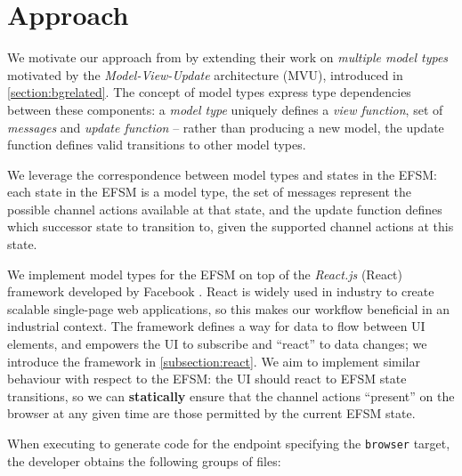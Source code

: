 \section{Approach}
\label{section:reactapproach}

We motivate our approach from \cite{MVU2020} by extending
their work on \textit{multiple model types} motivated by the
\textit{Model-View-Update} architecture (MVU),
introduced in \cref{section:bgrelated}.
The concept of model types express type dependencies between these
components: a \emph{model type} uniquely defines a \textit{view function},
set of \textit{messages} and \textit{update function} -- rather than
producing a new model, the update function defines valid transitions to
other model types.

We leverage the correspondence between model types 
and states in the EFSM:
each state in the EFSM is a model type, the set of messages represent
the possible channel actions available at that state,
and the update function defines which successor state to transition to,
given the supported channel actions at this state.

We implement model types for the EFSM on top of the 
\emph{React.js} (React) framework developed by Facebook \cite{React}.
React is widely used in industry to create scalable single-page
web applications, so this makes our workflow beneficial in an
industrial context. 
The framework defines a way for data to flow
between UI elements, and empowers the UI to subscribe and
``react'' to data changes;
we introduce the framework in \cref{subsection:react}.
We aim to implement similar behaviour with respect to the EFSM:
the UI should react to EFSM state transitions,
so we can \textbf{statically} ensure that the
channel actions ``present'' on the browser at any given time
are those permitted by the current EFSM state.

When executing \reactcodegen to generate code
for the  endpoint specifying the
\texttt{browser} target, the developer obtains the following 
groups of files:

